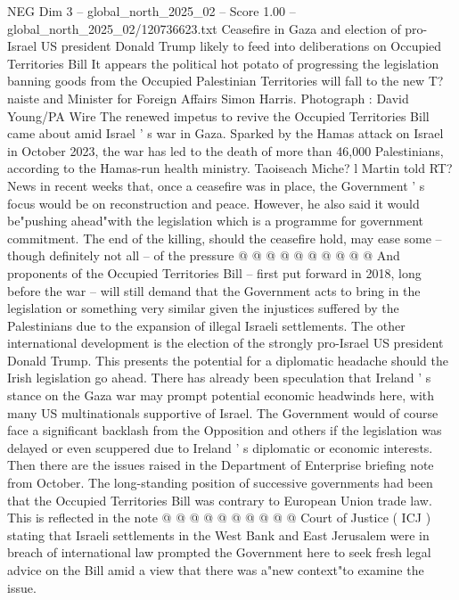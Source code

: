 \begin{textsample}{NEG Dim 3 – global\_north\_2025\_02 – Score 1.00 – global\_north\_2025\_02/120736623.txt}  \label{ex:f3_neg_180}
Ceasefire in Gaza and election of pro-Israel US president Donald Trump likely to feed into deliberations on Occupied Territories Bill It appears the political hot potato of progressing the legislation banning goods from the Occupied Palestinian Territories will fall to the new T? naiste and Minister for Foreign Affairs Simon Harris.
Photograph : David Young/PA Wire The renewed impetus to revive the Occupied Territories Bill came about amid Israel ' s war in Gaza.
Sparked by the Hamas attack on Israel in October 2023, the war has led to the death of more than 46,000 Palestinians, according to the Hamas-run health ministry.
Taoiseach Miche? l Martin told RT?
News in recent weeks that, once a ceasefire was in place, the Government ' s focus would be on reconstruction and peace.
However, he also said it would be"pushing ahead"with the legislation which is a programme for government commitment.
The end of the killing, should the ceasefire hold, may ease some -- though definitely not all -- of the pressure @ @ @ @ @ @ @ @ @ @ And proponents of the Occupied Territories Bill -- first put forward in 2018, long before the war -- will still demand that the Government acts to bring in the legislation or something very similar given the injustices suffered by the Palestinians due to the expansion of illegal Israeli settlements.
The other international development is the election of the strongly pro-Israel US president Donald Trump.
This presents the potential for a diplomatic headache should the Irish legislation go ahead.
There has already been speculation that Ireland ' s stance on the Gaza war may prompt potential economic headwinds here, with many US multinationals supportive of Israel.
The Government would of course face a significant backlash from the Opposition and others if the legislation was delayed or even scuppered due to Ireland ' s diplomatic or economic interests.
Then there are the issues raised in the Department of Enterprise briefing note from October.
The long-standing position of successive governments had been that the Occupied Territories Bill was contrary to European Union trade law.
This is reflected in the note @ @ @ @ @ @ @ @ @ @ Court of Justice ( ICJ ) stating that Israeli settlements in the West Bank and East Jerusalem were in breach of international law prompted the Government here to seek fresh legal advice on the Bill amid a view that there was a"new context"to examine the issue.

\end{textsample}

